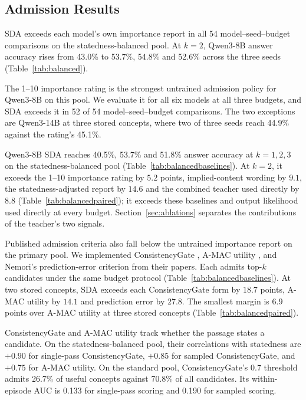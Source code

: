 \subsection{Admission Results}
\label{sec:recall}

SDA exceeds each model's own importance report in all 54
model--seed--budget comparisons on the statedness-balanced pool.
At $k=2$, Qwen3-8B answer accuracy rises from 43.0\% to 53.7\%,
54.8\% and 52.6\% across the three seeds
(Table~\ref{tab:balanced}).

The 1--10 importance rating is the strongest untrained admission policy
for Qwen3-8B on this pool. We evaluate it for all six models at all three
budgets, and SDA exceeds it in 52 of 54 model--seed--budget comparisons.
The two exceptions are Qwen3-14B at three stored concepts, where two
of three seeds reach 44.9\% against the rating's 45.1\%.



Qwen3-8B SDA reaches 40.5\%, 53.7\% and 51.8\% answer accuracy at
$k=1,2,3$ on the statedness-balanced pool
(Table~\ref{tab:balancedbaselines}). At $k=2$, it exceeds the 1--10
importance rating by $5.2$ points, implied-content wording by $9.1$,
the statedness-adjusted report by $14.6$ and the combined teacher
used directly by $8.8$ (Table~\ref{tab:balancedpaired}); it exceeds
these baselines and output likelihood used directly at every budget.
Section~\ref{sec:ablations} separates the contributions of the
teacher's two signals.



Published admission criteria also fall below the untrained importance
report on the primary pool. We implemented ConsistencyGate
\citep{consistencygate2026}, A-MAC utility \citep{amac2026}, and Nemori's
prediction-error criterion \citep{nemori2026} from their papers.
Each admits top-$k$ candidates under the same budget protocol
(Table~\ref{tab:balancedbaselines}). At two stored concepts, SDA
exceeds each ConsistencyGate form by $18.7$ points, A-MAC utility by
$14.1$ and prediction error by $27.8$. The smallest margin is $6.9$
points over A-MAC utility at three stored concepts
(Table~\ref{tab:balancedpaired}).

ConsistencyGate and A-MAC utility track whether the passage states a
candidate. On the statedness-balanced pool, their correlations with
statedness are $+0.90$ for single-pass ConsistencyGate, $+0.85$ for
sampled ConsistencyGate, and $+0.75$ for A-MAC utility. On the standard
pool, ConsistencyGate's 0.7 threshold admits 26.7\% of useful concepts
against 70.8\% of all candidates. Its within-episode AUC is 0.133 for
single-pass scoring and 0.190 for sampled scoring.

